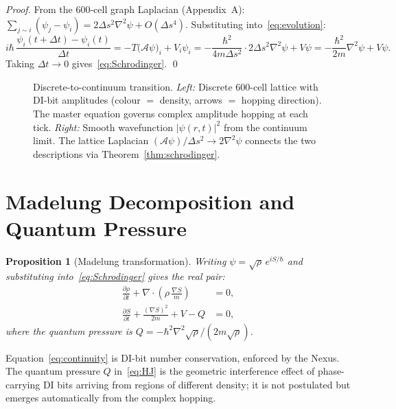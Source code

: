 \documentclass[11pt,a4paper]{article}
\newtheorem{proposition}[theorem]{Proposition}
\begin{document}
\begin{proof}
From the 600-cell graph Laplacian (Appendix~A):
$\sum_{j\sim i}(\psi_j - \psi_i) = 2\Delta s^2\nabla^2\psi
+ O(\Delta s^4)$.  Substituting into~\eqref{eq:evolution}:
\begin{equation}
i\hbar\,\frac{\psi_i(t+\Delta t) - \psi_i(t)}{\Delta t}
= -T\bigl(\mathcal{A}\psi\bigr)_i + V_i\psi_i
= -\frac{\hbar^2}{4m\Delta s^2}\cdot 2\Delta s^2\nabla^2\psi + V\psi
= -\frac{\hbar^2}{2m}\nabla^2\psi + V\psi.
\end{equation}
Taking $\Delta t \to 0$ gives~\eqref{eq:Schrodinger}. \qed
\end{proof}

\begin{figure}[H]
\centering

\caption{Discrete-to-continuum transition.
  \textit{Left:} Discrete 600-cell lattice with DI-bit amplitudes
  (colour $=$ density, arrows $=$ hopping direction).  The master equation
  governs complex amplitude hopping at each tick.
  \textit{Right:} Smooth wavefunction $|\psi(r,t)|^2$ from the continuum
  limit.  The lattice Laplacian $(\mathcal{A}\psi)/\Delta s^2 \to 2\nabla^2\psi$
  connects the two descriptions via Theorem~\ref{thm:schrodinger}.}
\label{fig:discrete_continuum}
\end{figure}

\section{Madelung Decomposition and Quantum Pressure}

\begin{proposition}[Madelung transformation]
Writing $\psi = \sqrt{\rho}\,e^{iS/\hbar}$ and substituting
into~\eqref{eq:Schrodinger} gives the real pair:
\begin{align}
\frac{\partial\rho}{\partial t}
+ \nabla\cdot\!\left(\rho\,\frac{\nabla S}{m}\right) &= 0,
\label{eq:continuity}\\
\frac{\partial S}{\partial t}
+ \frac{(\nabla S)^2}{2m} + V - Q &= 0,
\label{eq:HJ}
\end{align}
where the quantum pressure is
$Q = -\hbar^2\nabla^2\!\sqrt{\rho}/(2m\sqrt{\rho})$.
\end{proposition}

Equation~\eqref{eq:continuity} is DI-bit number conservation, enforced
by the Nexus.  The quantum pressure $Q$ in~\eqref{eq:HJ} is the
geometric interference effect of phase-carrying DI bits arriving from
regions of different density; it is not postulated but emerges
automatically from the complex hopping.
\end{document}
